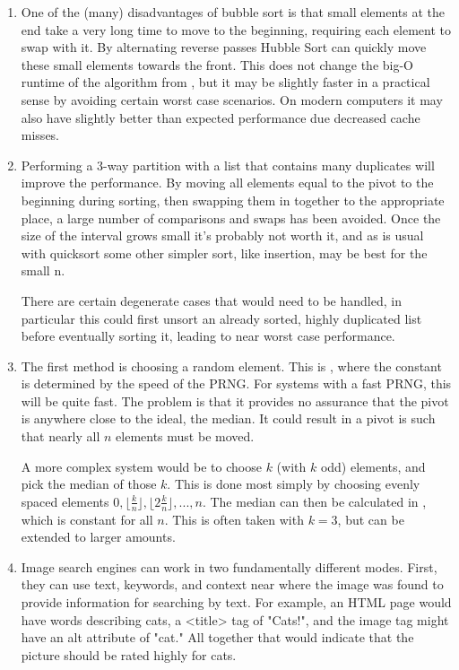 \documentclass[12pt]{chmullighw}
\begin{document}
\begin{enumerate}
\begin{enumerate}
\begin{tikzpicture}
        \end{tikzpicture}


\end{enumerate}


\item One of the (many) disadvantages of bubble sort is that small elements at the end take a very long time to move to the beginning, requiring each element to swap with it. By alternating reverse passes Hubble Sort can quickly move these small elements towards the front. This does not change the big-O runtime of the algorithm from , but it may be slightly faster in a practical sense by avoiding certain worst case scenarios. On modern computers it may also have slightly  better than expected performance due decreased cache misses.


\item Performing a 3-way partition with a list that contains many duplicates will improve the performance. By moving all elements equal to the pivot to the beginning during sorting, then swapping them in together to the appropriate place, a large number of comparisons and swaps has been avoided. Once the size of the interval grows small it's probably not worth it, and as is usual with quicksort some other simpler sort, like insertion, may be best for the small n.

There are certain degenerate cases that would need to be handled, in particular this could first unsort an already sorted, highly duplicated list before eventually sorting it, leading to near worst case performance.


\item The first method is choosing a random element. This is , where the constant is determined by the speed of the PRNG. For systems with a fast PRNG, this will be quite fast. The problem is that it provides no assurance that the pivot is anywhere close to the ideal, the median. It could result in a pivot is such that nearly all $n$ elements must be moved.

A more complex system would be to choose $k$ (with $k$ odd) elements, and pick the median of those $k$. This is done most simply by choosing evenly spaced elements $0, \lfloor\frac{k}{n}\rfloor, \lfloor2\frac{k}{n}\rfloor, ..., n$. The median can then be calculated in , which is constant for all $n$. This is often taken with $k = 3$, but can be extended to larger amounts.


\item Image search engines can work in two fundamentally different modes. First, they can use text, keywords, and context near where the image was found to provide information for searching by text. For example, an HTML page would have words describing cats, a <title> tag of "Cats!", and the image tag might have an alt attribute of "cat." All together that would indicate that the picture should be rated highly for cats.


\end{enumerate}
\end{document}
